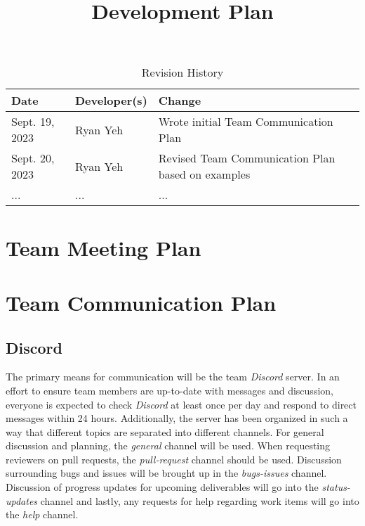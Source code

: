 \documentclass{article}
\title{Development Plan\\\progname}
\author{\authname}
\date{}
\begin{document}
\maketitle

\begin{table}[hp]
\caption{Revision History} \label{TblRevisionHistory}
\begin{tabularx}{\textwidth}{llX}
\toprule
\textbf{Date} & \textbf{Developer(s)} & \textbf{Change}\\
\midrule
Sept. 19, 2023 & Ryan Yeh & Wrote initial Team Communication Plan\\
Sept. 20, 2023 & Ryan Yeh & Revised Team Communication Plan based on examples\\
... & ... & ...\\
\bottomrule
\end{tabularx}
\end{table}


\section{Team Meeting Plan}

\section{Team Communication Plan}

\subsection{Discord}

The primary means for communication will be the team \emph{Discord} server. In an effort to 
ensure team members are up-to-date with messages and discussion, everyone is expected to check \emph{Discord}
at least once per day and respond to direct messages within 24 hours.
Additionally, the server has been organized in such a way that different topics are separated into different channels. 
For general  discussion and planning, the \emph{general} channel will be used. When requesting reviewers on pull requests, 
the \emph{pull-request} channel should be used. Discussion surrounding bugs and issues will be brought up in the 
\emph{bugs-issues} channel. Discussion of progress updates for upcoming deliverables will go into the
\emph{status-updates} channel and lastly, any requests for help regarding work items will go into the \emph{help} channel.
\end{document}
